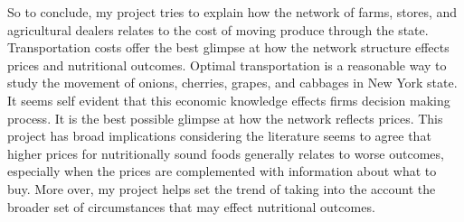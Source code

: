 \documentclass{report}
\begin{document}
So to conclude, my project tries to explain how the network of farms, stores, and agricultural dealers relates to the cost of moving produce through the state. Transportation costs offer the best glimpse at how the network structure effects prices and nutritional outcomes.  Optimal transportation is a reasonable way to study the movement of onions, cherries, grapes, and cabbages in New York state. It seems self evident that this economic knowledge effects firms decision making process. It is the best possible glimpse at how the network reflects prices. This project has broad implications considering the literature seems to agree that higher prices for nutritionally sound foods generally relates to worse outcomes, especially when the prices are complemented with information about what to buy. More over, my project helps set the trend of taking into the account the broader set of circumstances that may effect nutritional outcomes. 



\pagebreak
\end{document}
